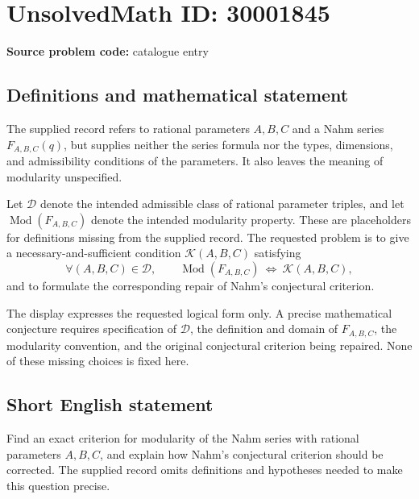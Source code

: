 \documentclass[11pt]{article}
\begin{document}
\section*{UnsolvedMath ID: 30001845}
\textbf{Source problem code:} catalogue entry
\subsection{Definitions and mathematical statement}
The supplied record refers to rational parameters \(A,B,C\) and a Nahm series \(F_{A,B,C}(q)\), but supplies neither the series formula nor the types, dimensions, and admissibility conditions of the parameters. It also leaves the meaning of modularity unspecified.

Let \(\mathcal D\) denote the intended admissible class of rational parameter triples, and let \(\operatorname{Mod}(F_{A,B,C})\) denote the intended modularity property. These are placeholders for definitions missing from the supplied record. The requested problem is to give a necessary-and-sufficient condition \(\mathcal K(A,B,C)\) satisfying
\[
\forall (A,B,C)\in\mathcal D,\qquad
\operatorname{Mod}(F_{A,B,C})\ \Longleftrightarrow\ \mathcal K(A,B,C),
\]
and to formulate the corresponding repair of Nahm's conjectural criterion.

The display expresses the requested logical form only. A precise mathematical conjecture requires specification of \(\mathcal D\), the definition and domain of \(F_{A,B,C}\), the modularity convention, and the original conjectural criterion being repaired. None of these missing choices is fixed here.
\subsection{Short English statement}
Find an exact criterion for modularity of the Nahm series with rational parameters \(A,B,C\), and explain how Nahm's conjectural criterion should be corrected. The supplied record omits definitions and hypotheses needed to make this question precise.
\end{document}
